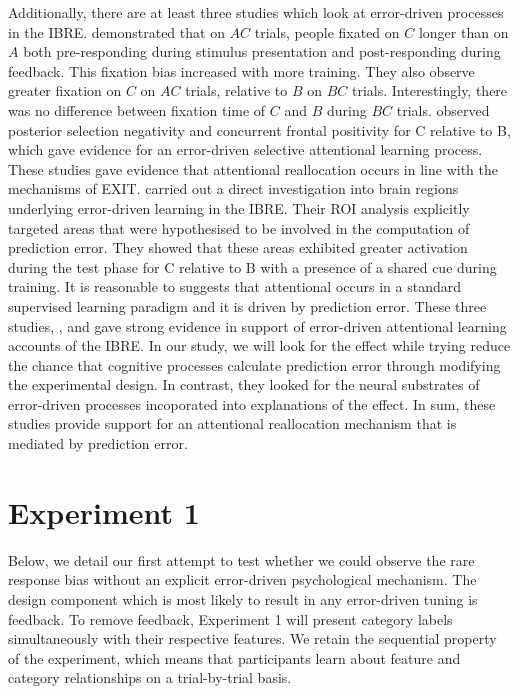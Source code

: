 \documentclass[10pt,letterpaper]{article}
\begin{document}
Additionally, there are at least three studies which look at error-driven processes in the IBRE.
 demonstrated that on $AC$ trials, people fixated on $C$ longer than on $A$ both pre-responding during stimulus presentation and post-responding during feedback.
This fixation bias increased with more training.
They also observe greater fixation on $C$ on $AC$ trials, relative to $B$ on $BC$ trials.
Interestingly, there was no difference between fixation time of $C$ and $B$ during $BC$ trials.
 observed posterior selection negativity and concurrent frontal positivity for C relative to B, which gave evidence for an error-driven selective attentional learning process.
These studies gave evidence that attentional reallocation occurs in line with the mechanisms of EXIT.
 carried out a direct investigation into brain regions underlying error-driven learning in the IBRE.
Their ROI analysis explicitly targeted areas that were hypothesised to be involved in the computation of prediction error.
They showed that these areas exhibited greater activation during the test phase for C relative to B with a presence of a shared cue during training.
It is reasonable to suggests that attentional occurs in a standard supervised learning paradigm and it is driven by prediction error.
These three studies, ,  and  gave strong evidence in support of error-driven attentional learning accounts of the IBRE.
In our study, we will look for the effect while trying reduce the chance that cognitive processes calculate prediction error through modifying the experimental design.
In contrast, they looked for the neural substrates of error-driven processes incoporated into explanations of the effect.
In sum, these studies provide support for an attentional reallocation mechanism that is mediated by prediction error.

\section{Experiment 1}

Below, we detail our first attempt to test whether we could observe the rare response bias without an explicit error-driven psychological mechanism.
The design component which is most likely to result in any error-driven tuning is feedback.
To remove feedback, Experiment 1 will present category labels simultaneously with their respective features.
We retain the sequential property of the experiment, which means that participants learn about feature and category relationships on a trial-by-trial basis.
\end{document}
